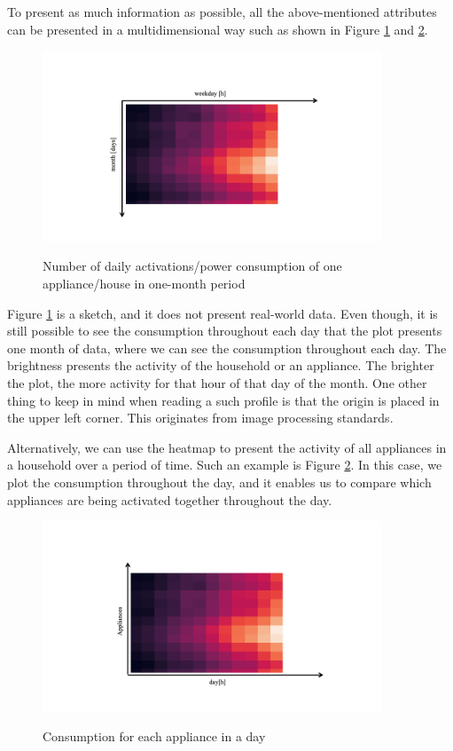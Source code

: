 To present as much information as possible,
all the above-mentioned attributes can be presented in a multidimensional way such as shown in Figure \ref{fig:heatmap_2dtime} and \ref{fig:heatmap_all_appl}.

\begin{figure}[H]
	\centering
	\caption{Number of daily activations/power consumption of one appliance/house in one-month period}
	\includegraphics[width=0.9\textwidth]{Figures/profile_sketches/Slide10.png}
	\label{fig:heatmap_2dtime}
\end{figure}

Figure \ref{fig:heatmap_2dtime} is a sketch, and it does not present real-world data.
Even though, it is still possible to see the consumption throughout each day that the plot presents one month of data, where we can see the consumption throughout each day.
The brightness presents the activity of the household or an appliance. 
The brighter the plot, the more activity for that hour of that day of the month.
One other thing to keep in mind when reading a such profile is that the origin is placed in the upper left corner.
This originates from image processing standards.

Alternatively, we can use the heatmap to present the activity of all appliances in a household over a period of time.
Such an example is Figure \ref{fig:heatmap_all_appl}.
In this case, we plot the consumption throughout the day, and it enables us to compare which appliances are being activated together throughout the day.

\begin{figure}[H]
	\centering
	\caption{Consumption for each appliance in a day}
	\includegraphics[width=0.9\textwidth]{Figures/profile_sketches/Slide12.png}
	\label{fig:heatmap_all_appl}
\end{figure}

